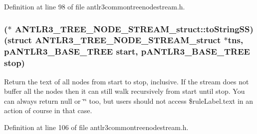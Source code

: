 Definition at line 98 of file antlr3commontreenodestream.\-h.

\hypertarget{struct_a_n_t_l_r3___t_r_e_e___n_o_d_e___s_t_r_e_a_m__struct_ae867da76a4f0fb0092ca2bbfe424ec56}{
\subsubsection[{to\-String\-S\-S}]{($\ast$ A\-N\-T\-L\-R3\-\_\-\-T\-R\-E\-E\-\_\-\-N\-O\-D\-E\-\_\-\-S\-T\-R\-E\-A\-M\-\_\-struct\-::to\-String\-S\-S)(struct {\bf A\-N\-T\-L\-R3\-\_\-\-T\-R\-E\-E\-\_\-\-N\-O\-D\-E\-\_\-\-S\-T\-R\-E\-A\-M\-\_\-struct} $\ast$tns, {\bf p\-A\-N\-T\-L\-R3\-\_\-\-B\-A\-S\-E\-\_\-\-T\-R\-E\-E} start, {\bf p\-A\-N\-T\-L\-R3\-\_\-\-B\-A\-S\-E\-\_\-\-T\-R\-E\-E} stop)}}\label{struct_a_n_t_l_r3___t_r_e_e___n_o_d_e___s_t_r_e_a_m__struct_ae867da76a4f0fb0092ca2bbfe424ec56}
Return the text of all nodes from start to stop, inclusive. If the stream does not buffer all the nodes then it can still walk recursively from start until stop. You can always return null or \char`\"{}\char`\"{} too, but users should not access \$rule\-Label.\-text in an action of course in that case. 

Definition at line 106 of file antlr3commontreenodestream.\-h.

